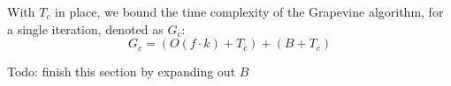With $T_c$ in place, we bound the time complexity of the \textsf{Grapevine}
algorithm, for a single iteration, denoted as $G_c$:
\[
G_c = (O(f\cdot k) + T_c) + (B + T_c)
\]

Todo: finish this section by expanding out $B$



